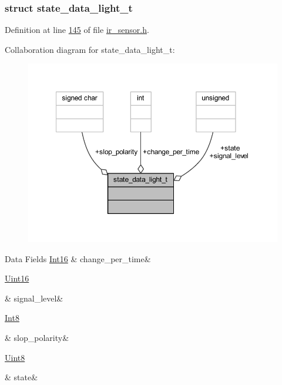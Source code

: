 \subsubsection{struct state\+\_\+data\+\_\+light\+\_\+t}


Definition at line \hyperlink{a00017_source_l00145}{145} of file \hyperlink{a00017_source}{ir\+\_\+sensor.\+h}.



Collaboration diagram for state\+\_\+data\+\_\+light\+\_\+t\+:\nopagebreak
\begin{figure}[H]
\begin{center}
\leavevmode
\includegraphics[width=350pt]{d2/d5e/a00915}
\end{center}
\end{figure}
\begin{DoxyFields}{Data Fields}
\hypertarget{a00017_ad5c4f9a39d2a36632a53205ae8eb5a5d}{\hyperlink{a00072_a659ce9e5eb6571f9984ffc7caad2660a}{Int16}}\label{a00017_ad5c4f9a39d2a36632a53205ae8eb5a5d}
&
change\+\_\+per\+\_\+time&
\\
\hline

\hypertarget{a00017_abcdf2bc0c2e5a14863938ae28c3bc96e}{\hyperlink{a00072_a59a9f6be4562c327cbfb4f7e8e18f08b}{Uint16}}\label{a00017_abcdf2bc0c2e5a14863938ae28c3bc96e}
&
signal\+\_\+level&
\\
\hline

\hypertarget{a00017_a20a897f33766369aee53f87b907e227d}{\hyperlink{a00072_a7e31ca7716b8d85dd473450a5c5e5a97}{Int8}}\label{a00017_a20a897f33766369aee53f87b907e227d}
&
slop\+\_\+polarity&
\\
\hline

\hypertarget{a00017_a6b8d8e916bc56265a3fd279bd26b6d1b}{\hyperlink{a00072_af84840501dec18061d18a68c162a8fa2}{Uint8}}\label{a00017_a6b8d8e916bc56265a3fd279bd26b6d1b}
&
state&
\\
\hline

\end{DoxyFields}
\label{de/d94/a00603}
\hypertarget{a00017_de/d94/a00603}{}
